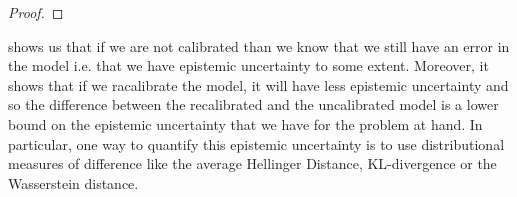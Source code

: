 \begin{proof}

\end{proof}





 shows us that if we are not calibrated than we know that we still have an error in the model i.e. that we have epistemic uncertainty to some extent. Moreover, it shows that if we racalibrate the model, it will have less epistemic uncertainty and so the difference between the recalibrated and the uncalibrated model is a lower bound on the epistemic uncertainty that we have for the problem at hand. In particular, one way to quantify this epistemic uncertainty is to use distributional measures of difference like the average Hellinger Distance, KL-divergence or the Wasserstein distance.

